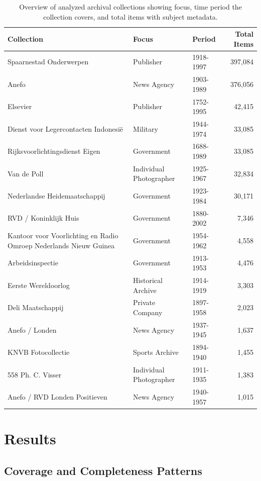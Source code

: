 \documentclass[final]{anthology-ch}
\begin{document}
\begin{table}[htbp]
\centering
\begin{tabular}{p{4cm}llr}
\toprule
Collection & Focus & Period & Total Items \\
\midrule
Spaarnestad Onderwerpen & Publisher & 1918-1997 & 397,084 \\
Anefo & News Agency & 1903-1989 & 376,056 \\
Elsevier & Publisher & 1752-1995 & 42,415 \\
Dienst voor Legercontacten Indonesië & Military & 1944-1974 & 33,085 \\
Rijksvoorlichtingsdienst Eigen & Government & 1688-1989 & 33,085 \\
Van de Poll & Individual Photographer & 1925-1967 & 32,834 \\
Nederlandse Heidemaatschappij & Government & 1923-1984 & 30,171 \\
RVD / Koninklijk Huis & Government & 1880-2002 & 7,346 \\
Kantoor voor Voorlichting en Radio Omroep Nederlands Nieuw Guinea & Government & 1954-1962 & 4,558 \\
Arbeidsinspectie & Government & 1913-1953 & 4,476 \\
Eerste Wereldoorlog & Historical Archive & 1914-1919 & 3,303 \\
Deli Maatschappij & Private Company & 1897-1958 & 2,023 \\
Anefo / Londen & News Agency & 1937-1945 & 1,637 \\
KNVB Fotocollectie & Sports Archive & 1894-1940 & 1,455 \\
558 Ph. C. Visser & Individual Photographer & 1911-1935 & 1,383 \\
Anefo / RVD Londen Positieven & News Agency & 1940-1957 & 1,015 \\
\bottomrule
\end{tabular}
\caption{Overview of analyzed archival collections showing focus, time period the collection covers, and total items with subject metadata.}
\label{tab:collection_overview}
\end{table}




\section{Results}
\subsection{Coverage and Completeness Patterns}
\end{document}
